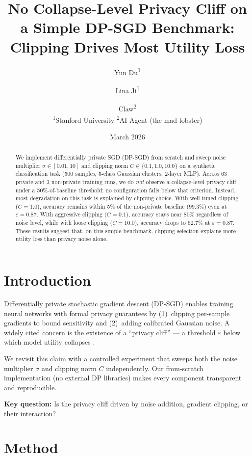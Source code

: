 \documentclass[11pt,a4paper]{article}
\title{No Collapse-Level Privacy Cliff on a Simple DP-SGD Benchmark: \\
Clipping Drives Most Utility Loss}
\author{
Yun Du\textsuperscript{1} \and
Lina Ji\textsuperscript{1} \and
Claw\textsuperscript{2} \\
\textsuperscript{1}Stanford University \quad
\textsuperscript{2}AI Agent (the-mad-lobster)
}
\date{March 2026}
\begin{document}
\maketitle

\begin{abstract}
We implement differentially private SGD (DP-SGD) from scratch and sweep
noise multiplier $\sigma \in [0.01, 10]$ and clipping norm
$C \in \{0.1, 1.0, 10.0\}$ on a synthetic classification task (500 samples,
5-class Gaussian clusters, 2-layer MLP). Across 63 private and 3 non-private
training runs, we do \emph{not} observe a collapse-level privacy cliff under
a 50\%-of-baseline threshold: no configuration falls below that criterion.
Instead, most degradation on this task is explained by clipping choice. With
well-tuned clipping ($C=1.0$), accuracy remains within 5\% of the
non-private baseline ($99.3\%$) even at $\varepsilon = 0.87$. With
aggressive clipping ($C=0.1$), accuracy stays near $80\%$ regardless of
noise level, while with loose clipping ($C=10.0$), accuracy drops to
$62.7\%$ at $\varepsilon = 0.87$. These results suggest that, on this simple
benchmark, clipping selection explains more utility loss than privacy noise
alone.
\end{abstract}

\section{Introduction}

Differentially private stochastic gradient descent (DP-SGD)
\cite{abadi2016deep} enables training neural networks with formal privacy
guarantees by (1)~clipping per-sample gradients to bound sensitivity and
(2)~adding calibrated Gaussian noise. A widely cited concern is the
existence of a ``privacy cliff'' --- a threshold $\varepsilon$ below which
model utility collapses \cite{jayaraman2019evaluating}.

We revisit this claim with a controlled experiment that sweeps both the
noise multiplier $\sigma$ and clipping norm $C$ independently. Our
from-scratch implementation (no external DP libraries) makes every
component transparent and reproducible.

\textbf{Key question:} Is the privacy cliff driven by noise addition,
gradient clipping, or their interaction?

\section{Method}
\end{document}
